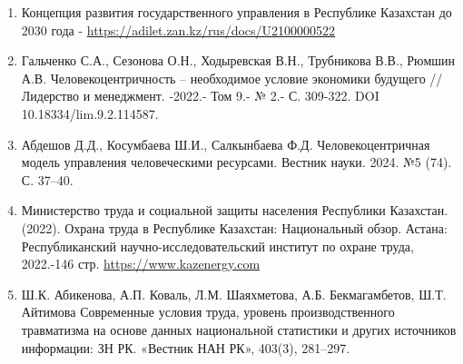 \begin{references}

\begin{enumerate}
\def\labelenumi{\arabic{enumi}.}
\item
  Концепция развития государственного управления в Республике Казахстан
  до 2030 года - \url{https://adilet.zan.kz/rus/docs/U2100000522}
\item
  Гальченко С.А., Сезонова О.Н., Ходыревская В.Н., Трубникова В.В.,
  Рюмшин А.В. Человекоцентричность -- необходимое условие экономики
  будущего // Лидерство и менеджмент. -2022.- Том 9.- № 2.- С. 309-322.
  DOI 10.18334/lim.9.2.114587.
\item
  Абдешов Д.Д., Косумбаева Ш.И., Салкынбаева Ф.Д. Человекоцентричная
  модель управления человеческими ресурсами. Вестник науки. 2024. №5
  (74). С. 37--40.
\item
  Министерство труда и социальной защиты населения Республики Казахстан.
  (2022). Охрана труда в Республике Казахстан: Национальный обзор.
  Астана: Республиканский научно-исследовательский институт по охране
  труда, 2022.-146 стр.
  \href{https://www.kazenergy.com/upload/document/development/ohrana_2023.pdf}{https://www.kazenergy.com}
\item
  Ш.К. Абикенова, А.П. Коваль, Л.М. Шаяхметова, А.Б. Бекмагамбетов, Ш.Т.
  Айтимова Современные условия труда, уровень производственного
  травматизма на основе данных национальной статистики и других
  источников информации: ЗН РК. «Вестник НАН РК», 403(3), 281--297.


\end{enumerate}
\end{references}
